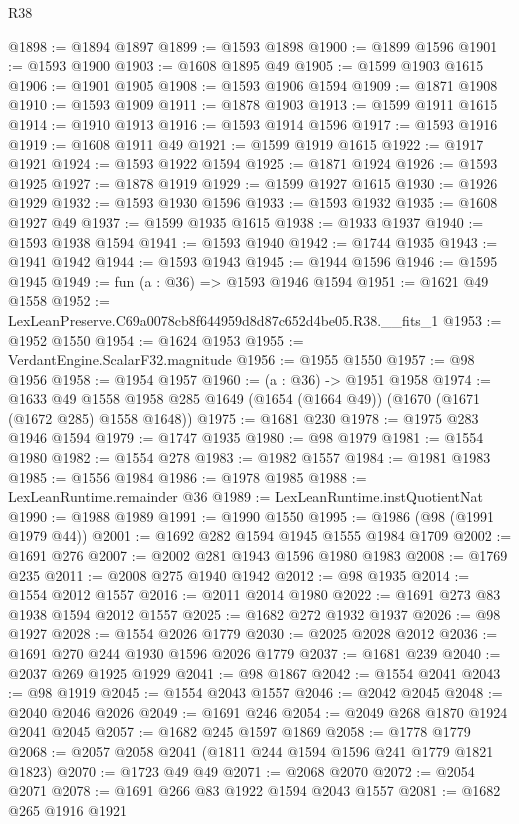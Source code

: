 \begin{lexlean}{R38}
\begin{coremodule}
@1898 := @1894 @1897
@1899 := @1593 @1898
@1900 := @1899 @1596
@1901 := @1593 @1900
@1903 := @1608 @1895 @49
@1905 := @1599 @1903 @1615
@1906 := @1901 @1905
@1908 := @1593 @1906 @1594
@1909 := @1871 @1908
@1910 := @1593 @1909
@1911 := @1878 @1903
@1913 := @1599 @1911 @1615
@1914 := @1910 @1913
@1916 := @1593 @1914 @1596
@1917 := @1593 @1916
@1919 := @1608 @1911 @49
@1921 := @1599 @1919 @1615
@1922 := @1917 @1921
@1924 := @1593 @1922 @1594
@1925 := @1871 @1924
@1926 := @1593 @1925
@1927 := @1878 @1919
@1929 := @1599 @1927 @1615
@1930 := @1926 @1929
@1932 := @1593 @1930 @1596
@1933 := @1593 @1932
@1935 := @1608 @1927 @49
@1937 := @1599 @1935 @1615
@1938 := @1933 @1937
@1940 := @1593 @1938 @1594
@1941 := @1593 @1940
@1942 := @1744 @1935
@1943 := @1941 @1942
@1944 := @1593 @1943
@1945 := @1944 @1596
@1946 := @1595 @1945
@1949 := fun (a : @36) => @1593 @1946 @1594
@1951 := @1621 @49 @1558
@1952 := LexLeanPreserve.C69a0078cb8f644959d8d87c652d4be05.R38.__fits_1
@1953 := @1952 @1550
@1954 := @1624 @1953
@1955 := VerdantEngine.ScalarF32.magnitude
@1956 := @1955 @1550
@1957 := @98 @1956
@1958 := @1954 @1957
@1960 := (a : @36) -> @1951 @1958
@1974 := @1633
    @49
    @1558
    @1958
    @285
    @1649
    (@1654 (@1664 @49))
    (@1670 (@1671 (@1672 @285) @1558 @1648))
@1975 := @1681 @230
@1978 := @1975 @283 @1946 @1594
@1979 := @1747 @1935
@1980 := @98 @1979
@1981 := @1554 @1980
@1982 := @1554 @278
@1983 := @1982 @1557
@1984 := @1981 @1983
@1985 := @1556 @1984
@1986 := @1978 @1985
@1988 := LexLeanRuntime.remainder @36
@1989 := LexLeanRuntime.instQuotientNat
@1990 := @1988 @1989
@1991 := @1990 @1550
@1995 := @1986 (@98 (@1991 @1979 @44))
@2001 := @1692 @282 @1594 @1945 @1555 @1984 @1709
@2002 := @1691 @276
@2007 := @2002 @281 @1943 @1596 @1980 @1983
@2008 := @1769 @235
@2011 := @2008 @275 @1940 @1942
@2012 := @98 @1935
@2014 := @1554 @2012 @1557
@2016 := @2011 @2014 @1980
@2022 := @1691 @273 @83 @1938 @1594 @2012 @1557
@2025 := @1682 @272 @1932 @1937
@2026 := @98 @1927
@2028 := @1554 @2026 @1779
@2030 := @2025 @2028 @2012
@2036 := @1691 @270 @244 @1930 @1596 @2026 @1779
@2037 := @1681 @239
@2040 := @2037 @269 @1925 @1929
@2041 := @98 @1867
@2042 := @1554 @2041
@2043 := @98 @1919
@2045 := @1554 @2043 @1557
@2046 := @2042 @2045
@2048 := @2040 @2046 @2026
@2049 := @1691 @246
@2054 := @2049 @268 @1870 @1924 @2041 @2045
@2057 := @1682 @245 @1597 @1869
@2058 := @1778 @1779
@2068 := @2057 @2058 @2041 (@1811 @244 @1594 @1596 @241 @1779 @1821 @1823)
@2070 := @1723 @49 @49
@2071 := @2068 @2070
@2072 := @2054 @2071
@2078 := @1691 @266 @83 @1922 @1594 @2043 @1557
@2081 := @1682 @265 @1916 @1921

\end{coremodule}
\end{lexlean}
